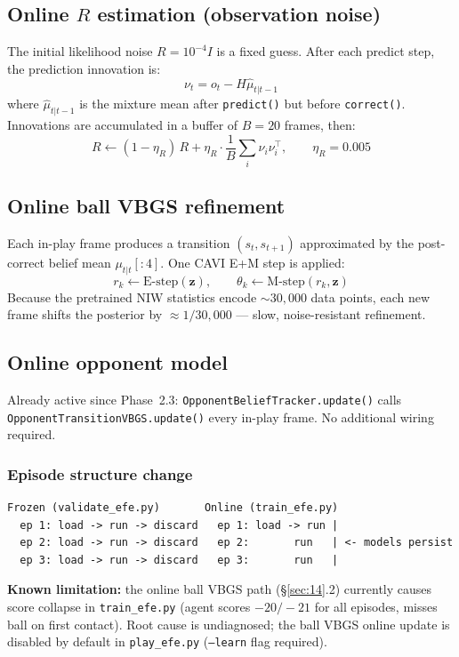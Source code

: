 \documentclass[12pt, a4paper]{article}
\newcommand{\1}{\mathbf{1}}
\newcommand{\code}[1]{\texttt{#1}}
\begin{document}
\subsection{Online $R$ estimation (observation noise)}

The initial likelihood noise $R = 10^{-4} I$ is a fixed guess.
After each predict step, the prediction innovation is:
\[
\nu_t = o_t - H \hat{\mu}_{t|t-1}
\]
where $\hat{\mu}_{t|t-1}$ is the mixture mean after \code{predict()} but before
\code{correct()}.  Innovations are accumulated in a buffer of $B=20$ frames, then:
\[
R \leftarrow (1 - \eta_R)\,R
+ \eta_R \cdot \frac{1}{B}\sum_{i} \nu_i \nu_i^\top,
\qquad \eta_R = 0.005
\]

\subsection{Online ball VBGS refinement}

Each in-play frame produces a transition $(s_t, s_{t+1})$ approximated by the
post-correct belief mean $\mu_{t|t}[:4]$.  One CAVI E+M step is applied:
\[
r_k \leftarrow \text{E-step}(\mathbf{z}), \qquad
\theta_k \leftarrow \text{M-step}(r_k, \mathbf{z})
\]
Because the pretrained NIW statistics encode $\sim 30{,}000$ data points, each
new frame shifts the posterior by $\approx 1/30{,}000$ --- slow, noise-resistant
refinement.

\subsection{Online opponent model}

Already active since Phase~2.3: \code{Oppo\-nent\-Belief\-Tracker.update()} calls
\code{Oppo\-nent\-Transition\-VBGS.update()} every in-play frame.
No additional wiring required.

\subsubsection*{Episode structure change}

\begin{lstlisting}[caption={Frozen vs online model lifecycle across episodes.}]
Frozen (validate_efe.py)       Online (train_efe.py)
  ep 1: load -> run -> discard   ep 1: load -> run |
  ep 2: load -> run -> discard   ep 2:       run   | <- models persist
  ep 3: load -> run -> discard   ep 3:       run   |
\end{lstlisting}

\noindent\textbf{Known limitation:} the online ball VBGS path (\S\ref{sec:14}.2)
currently causes score collapse in \code{train\_efe.py} (agent scores $-20/-21$
for all episodes, misses ball on first contact).  Root cause is undiagnosed; the
ball VBGS online update is disabled by default in \code{play\_efe.py}
(\code{--learn} flag required).
\end{document}
